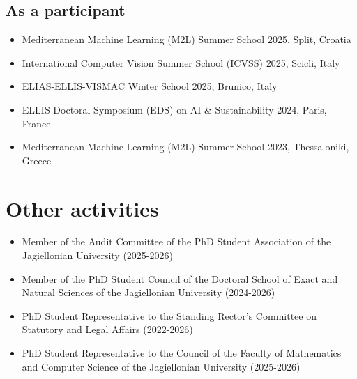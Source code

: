 \subsection{As a participant}
\begin{itemize}
    \item Mediterranean Machine Learning (M2L) Summer School 2025, Split, Croatia
    \item International Computer Vision Summer School (ICVSS) 2025, Scicli, Italy
    \item ELIAS-ELLIS-VISMAC Winter School 2025, Brunico, Italy
    \item ELLIS Doctoral Symposium (EDS) on AI \& Sustainability 2024, Paris, France
    \item Mediterranean Machine Learning (M2L) Summer School 2023, Thessaloniki, Greece
\end{itemize}

\section{Other activities}
\begin{itemize}
    \item Member of the Audit Committee of the PhD Student Association of the Jagiellonian University (2025-2026)
    \item Member of the PhD Student Council of the Doctoral School of Exact and Natural Sciences of the Jagiellonian University (2024-2026)
    \item PhD Student Representative to the Standing Rector's Committee on Statutory and Legal Affairs (2022-2026)
    \item PhD Student Representative to the Council of the Faculty of Mathematics and Computer Science of the Jagiellonian University (2025-2026)
\end{itemize}